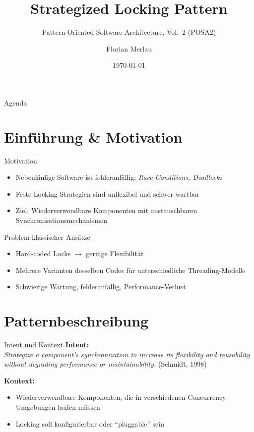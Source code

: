 \documentclass[aspectratio=169,10pt]{beamer}
\title[Strategized Locking Pattern]{Strategized Locking Pattern}
\subtitle{Pattern-Oriented Software Architecture, Vol.~2 (POSA2)}
\author[Florian Merlau]{Florian Merlau}
\institute[]{Master Informatik -- Advanced Software Quality (WiSe 25/26)}
\date{\today}
\begin{document}
\begin{frame}
  \titlepage
\end{frame}

\begin{frame}{Agenda}
  \tableofcontents[hideallsubsections]
\end{frame}

\section{Einf\"uhrung \& Motivation}
\begin{frame}{Motivation}
  \begin{itemize}
    \item Nebenl\"aufige Software ist fehleranf\"allig: \textit{Race Conditions, Deadlocks}
    \item Feste Locking-Strategien sind unflexibel und schwer wartbar
    \item Ziel: Wiederverwendbare Komponenten mit austauschbaren Synchronisationsmechanismen
  \end{itemize}
\end{frame}

\begin{frame}{Problem klassischer Ans\"atze}
  \begin{itemize}
    \item Hard-coded Locks $\rightarrow$ geringe Flexibilit\"at
    \item Mehrere Varianten desselben Codes f\"ur unterschiedliche Threading-Modelle
    \item Schwierige Wartung, fehleranf\"allig, Performance-Verlust
  \end{itemize}
\end{frame}

\section{Patternbeschreibung}
\begin{frame}{Intent und Kontext}
  \textbf{Intent:}\\
  \textit{Strategize a component's synchronization to increase its flexibility and reusability without degrading performance or maintainability.} (Schmidt, 1998)

  \vspace{1em}
  \textbf{Kontext:}
  \begin{itemize}
    \item Wiederverwendbare Komponenten, die in verschiedenen Concurrency-Umgebungen laufen m\"ussen
    \item Locking soll konfigurierbar oder \enquote{pluggable} sein
  \end{itemize}
\end{frame}
\end{document}
